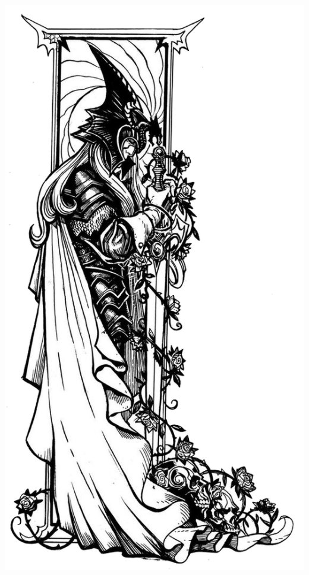 \clearpage



\begin{multicols*}{2}


\begin{Figure}
\centering
\includegraphics[width=\textwidth]{img/elric.png}
\end{Figure}
    

\end{multicols*}